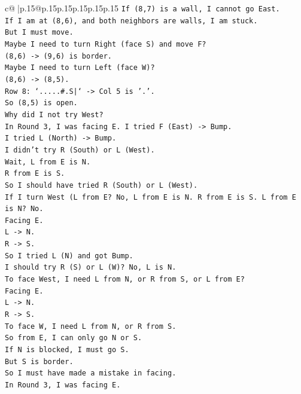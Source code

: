 \documentclass{article}
\begin{document}
{\begin{supertabular}{c@{$\;$}|p{.15\linewidth}@{}p{.15\linewidth}p{.15\linewidth}p{.15\linewidth}p{.15\linewidth}p{.15\linewidth}}
{{{\texttt{If (8,7) is a wall, I cannot go East.} \\
\texttt{If I am at (8,6), and both neighbors are walls, I am stuck.} \\
\texttt{But I must move.} \\
\texttt{Maybe I need to turn Right (face S) and move F?} \\
\texttt{(8,6) {-}> (9,6) is border.} \\
\texttt{Maybe I need to turn Left (face W)?} \\
\texttt{(8,6) {-}> (8,5).} \\
\texttt{Row 8: `.....\#.S|` {-}> Col 5 is '.'.} \\
\texttt{So (8,5) is open.} \\
\texttt{Why did I not try West?} \\
\texttt{In Round 3, I was facing E. I tried F (East) {-}> Bump.} \\
\texttt{I tried L (North) {-}> Bump.} \\
\texttt{I didn't try R (South) or L (West).} \\
\texttt{Wait, L from E is N.} \\
\texttt{R from E is S.} \\
\texttt{So I should have tried R (South) or L (West).} \\
\texttt{If I turn West (L from E? No, L from E is N. R from E is S. L from E is N? No.} \\
\texttt{Facing E.} \\
\texttt{L {-}> N.} \\
\texttt{R {-}> S.} \\
\texttt{So I tried L (N) and got Bump.} \\
\texttt{I should try R (S) or L (W)? No, L is N.} \\
\texttt{To face West, I need L from N, or R from S, or L from E?} \\
\texttt{Facing E.} \\
\texttt{L {-}> N.} \\
\texttt{R {-}> S.} \\
\texttt{To face W, I need L from N, or R from S.} \\
\texttt{So from E, I can only go N or S.} \\
\texttt{If N is blocked, I must go S.} \\
\texttt{But S is border.} \\
\texttt{So I must have made a mistake in facing.} \\
\texttt{In Round 3, I was facing E.} \\
}}}
\end{supertabular}}
\end{document}
